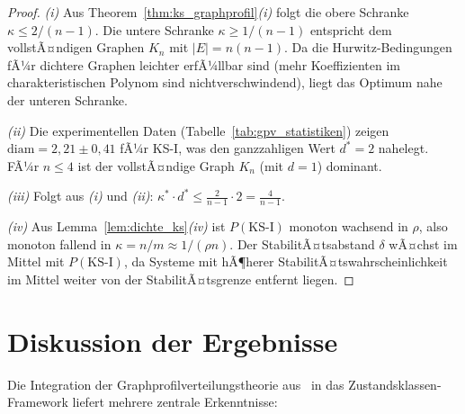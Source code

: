 ﻿\documentclass[12pt, a4paper, titlepage]{report}
\theoremstyle{definition}
\theoremstyle{remark}
\newcommand{\KS}{\mathrm{KS}}
\begin{document}
\begin{proof}
\textit{(i)} Aus Theorem~\ref{thm:ks_graphprofil}\textit{(i)} folgt die obere Schranke
$\kappa \leq 2/(n-1)$. Die untere Schranke $\kappa \geq 1/(n-1)$ entspricht dem
vollstÃ¤ndigen Graphen $K_n$ mit $|E| = n(n-1)$. Da die Hurwitz-Bedingungen fÃ¼r
dichtere Graphen leichter erfÃ¼llbar sind (mehr Koeffizienten im charakteristischen
Polynom sind nichtverschwindend), liegt das Optimum nahe der unteren Schranke.

\textit{(ii)} Die experimentellen Daten (Tabelle~\ref{tab:gpv_statistiken}) zeigen
$\mathrm{diam} = 2{,}21 \pm 0{,}41$ fÃ¼r KS-I, was den ganzzahligen Wert $d^* = 2$
nahelegt. FÃ¼r $n \leq 4$ ist der vollstÃ¤ndige Graph $K_n$ (mit $d = 1$) dominant.

\textit{(iii)} Folgt aus \textit{(i)} und \textit{(ii)}: $\kappa^* \cdot d^* \leq
\frac{2}{n-1} \cdot 2 = \frac{4}{n-1}$.

\textit{(iv)} Aus Lemma~\ref{lem:dichte_ks}\textit{(iv)} ist $P(\KS\text{-I})$
monoton wachsend in $\rho$, also monoton fallend in $\kappa = n/m \approx 1/(\rho n)$.
Der StabilitÃ¤tsabstand $\delta$ wÃ¤chst im Mittel mit $P(\KS\text{-I})$, da Systeme
mit hÃ¶herer StabilitÃ¤tswahrscheinlichkeit im Mittel weiter von der StabilitÃ¤tsgrenze
entfernt liegen.
\end{proof}

\section{Diskussion der Ergebnisse}

Die Integration der Graphprofilverteilungstheorie aus~\citep{epp2026graphs} in das
Zustandsklassen-Framework liefert mehrere zentrale Erkenntnisse:
\end{document}
